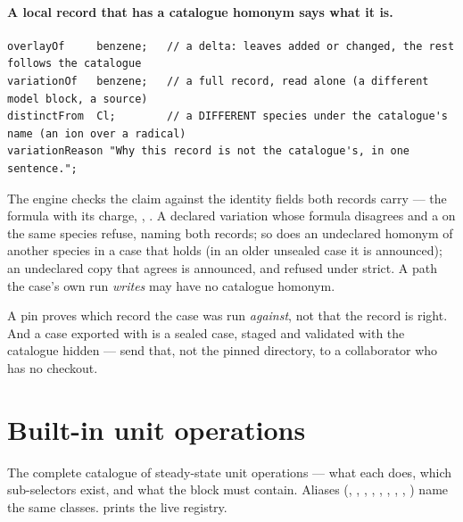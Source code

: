 \documentclass[11pt,a4paper]{article}
\begin{document}
\paragraph{A local record that has a catalogue homonym says what it is.}
\begin{lstlisting}
overlayOf     benzene;   // a delta: leaves added or changed, the rest follows the catalogue
variationOf   benzene;   // a full record, read alone (a different model block, a source)
distinctFrom  Cl;        // a DIFFERENT species under the catalogue's name (an ion over a radical)
variationReason "Why this record is not the catalogue's, in one sentence.";
\end{lstlisting}
The engine checks the claim against the identity fields both records carry
--- the formula with its charge, , .  A declared
variation whose formula disagrees and a  on the same species
refuse, naming both records; so does an undeclared homonym of another species in a
case that holds  (in an older unsealed case it is announced); an
undeclared copy that agrees is announced, and refused under strict.  A path
the case's own run \emph{writes} may have no catalogue homonym.

\begin{pitfall}
A pin proves which record the case was run \emph{against}, not that the
record is right.  And a case exported with  is a
sealed case, staged and validated with the catalogue hidden --- send that,
not the pinned directory, to a collaborator who has no checkout.
\end{pitfall}

\section{Built-in unit operations}\label{sec:units}

\begin{whatyoulllearn}
The complete catalogue of steady-state unit operations --- what each
 does, which  sub-selectors exist, and what the
 block must contain.  Aliases
(, , , ,
, , , ,
) name the same classes.
 prints the live registry.
\end{whatyoulllearn}
\end{document}
